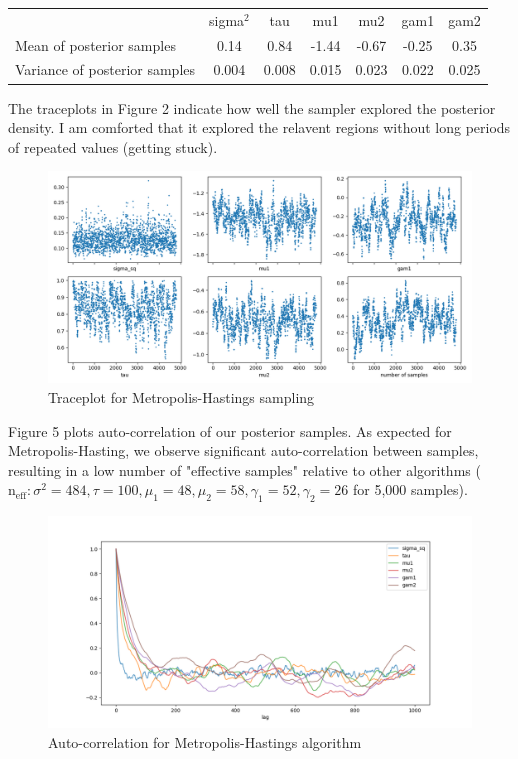 \documentclass[12pt,letterpaper,twoside]{article}
\begin{document}
\begin{table}[H]
    \begin{tabular}{lcccccc}
    \multicolumn{1}{c}{}          & sigma$^2$ & tau   & mu1   & mu2   & gam1  & gam2  \\
    Mean of posterior samples     & 0.14  & 0.84  & -1.44 & -0.67 & -0.25 & 0.35  \\
    Variance of posterior samples & 0.004 & 0.008 & 0.015 & 0.023 & 0.022 & 0.025
    \end{tabular}
\end{table}

The traceplots in Figure 2 indicate how well the sampler 
explored the posterior density. I am comforted that it explored the 
relavent regions without long periods of repeated values (getting stuck).
\begin{figure}[H]
    \centering
    \includegraphics[scale=0.55]{mh_sampled_traceplot.png}
    \vspace*{-10mm}
    \caption{Traceplot for Metropolis-Hastings sampling}
\end{figure}

Figure 5 plots auto-correlation of our posterior samples. As expected 
for Metropolis-Hasting, we observe significant auto-correlation between 
samples, resulting in a low number of "effective samples" relative 
to other algorithms ($\text{n}_{\text{eff}}: \sigma^2=484, \tau=100, \mu_1=48, \mu_2=58, \gamma_1=52, \gamma_2=26$ 
for 5,000 samples).
\begin{figure}[H]
    \centering
    \includegraphics[scale=0.6]{mh_autocorr_plot.png}
    \vspace*{-10mm}
    \caption{Auto-correlation for Metropolis-Hastings algorithm}
\end{figure}
\end{document}
